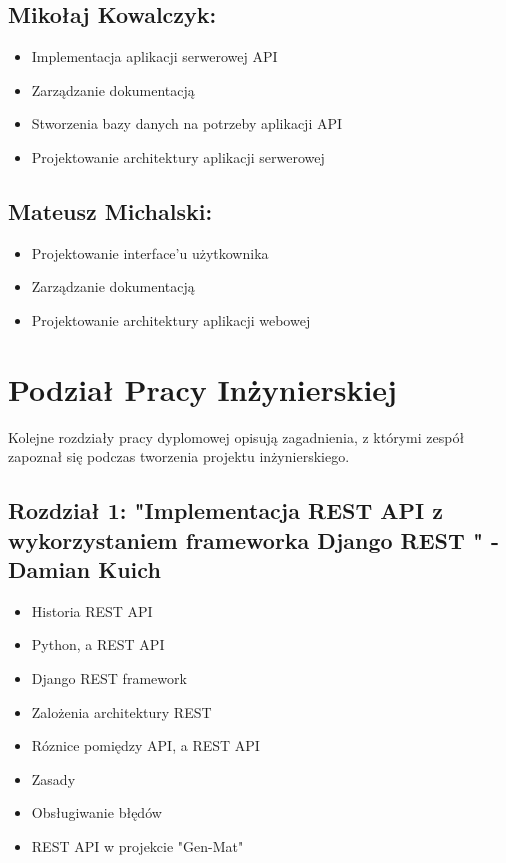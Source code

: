 \documentclass[oneside,polski,logo,indent]{amuthesis}
\begin{document}
\subsection{Mikołaj Kowalczyk:}
\begin{itemize}
\item Implementacja aplikacji serwerowej API
\item Zarządzanie dokumentacją
\item Stworzenia bazy danych na potrzeby aplikacji API
\item Projektowanie architektury aplikacji serwerowej
\end{itemize}
\subsection{Mateusz Michalski:}
\begin{itemize}
\item Projektowanie interface’u użytkownika
\item Zarządzanie dokumentacją
\item Projektowanie architektury aplikacji webowej
\end{itemize}



\section{Podział Pracy Inżynierskiej}

Kolejne rozdziały pracy dyplomowej opisują zagadnienia, z którymi zespół zapoznał
się podczas tworzenia projektu inżynierskiego.

\subsection{Rozdział 1: "Implementacja REST API z wykorzystaniem frameworka Django REST " -  Damian Kuich } 
\begin{itemize}
\item Historia REST API
\item Python, a REST API
\item  Django REST framework
\item Zalożenia architektury REST
\item Róznice pomiędzy API, a REST API
\item Zasady
\item Obsługiwanie błędów
\item REST API w projekcie "Gen-Mat"

\end{itemize}
\end{document}
